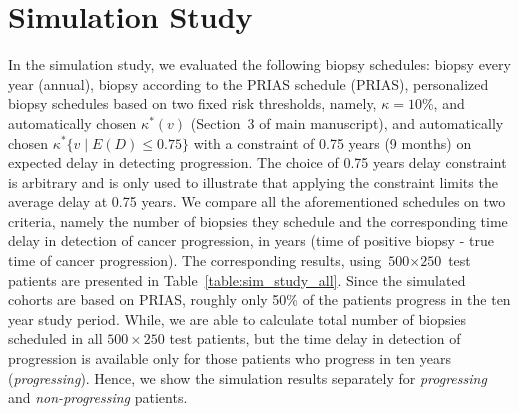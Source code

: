 \section{Simulation Study}
In the simulation study, we evaluated the following biopsy schedules: biopsy every year (annual), biopsy according to the PRIAS schedule (PRIAS), personalized biopsy schedules based on two fixed risk thresholds, namely, $\kappa=10\%$, and automatically chosen $\kappa^*(v)$ (Section~3 of main manuscript), and automatically chosen ${\kappa^*\{v \mid E(D)\leq 0.75\}}$ with a constraint of 0.75 years (9 months) on expected delay in detecting progression. The choice of 0.75 years delay constraint is arbitrary and is only used to illustrate that applying the constraint limits the average delay at 0.75 years.  We compare all the aforementioned schedules on two criteria, namely the number of biopsies they schedule and the corresponding time delay in detection of cancer progression, in years (time of positive biopsy - true time of cancer progression). The corresponding results, using ${\mbox{500} \times \mbox{250}}$ test patients are presented in Table~\ref{table:sim_study_all}. Since the simulated cohorts are based on PRIAS, roughly only 50\% of the patients progress in the ten year study period. While, we are able to calculate total number of biopsies scheduled in all $500 \times 250$ test patients, but the time delay in detection of progression is available only for those patients who progress in ten years (\textit{progressing}). Hence, we show the simulation results separately for \textit{progressing} and \textit{non-progressing} patients.


